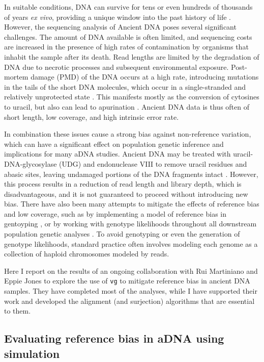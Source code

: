 \documentclass[a4paper,12pt,numbered,oneside]{Classes/PhDThesisPSnPDF}
\begin{document}
In suitable conditions, DNA can survive for tens or even hundreds of thousands of years \emph{ex vivo}, providing a unique window into the past history of life \cite{dabney2013ancient}.
However, the sequencing analysis of Ancient DNA poses several significant challenges.
The amount of DNA available is often limited, and sequencing costs are increased in the presence of high rates of contamination by organisms that inhabit the sample after its death.
Read lengths are limited by the degradation of DNA due to necrotic processes and subsequent environmental exposure.
Post-mortem damage (PMD) of the DNA occurs at a high rate, introducing mutations in the tails of the short DNA molecules, which occur in a single-stranded and relatively unprotected state \cite{link2017atlas}.
This manifests mostly as the conversion of cytosines to uracil, but also can lead to apurination \cite{dabney2013ancient}.
Ancient DNA data is thus often of short length, low coverage, and high intrinsic error rate.

In combination these issues cause a strong bias against non-reference variation, which can have a significant effect on population genetic inference and implications for many aDNA studies.
Ancient DNA may be treated with uracil-DNA-glycosylase (UDG) and endonuclease VIII to remove uracil residues and abasic sites, leaving undamaged portions of the DNA fragments intact \cite{briggs2009removal}.
However, this process results in a reduction of read length and library depth, which is disadvantageous, and it is not guaranteed to proceed without introducing new bias.
There have also been many attempts to mitigate the effects of reference bias and low coverage, such as by implementing a model of reference bias in gentoyping \cite{pruefer2018snpad}, or by working with genotype likelihoods throughout all downstream population genetic analyses \cite{link2017atlas}.
To avoid genotyping or even the generation of genotype likelihoods, standard practice often involves modeling each genome as a collection of haploid chromosomes modeled by reads.

Here I report on the results of an ongoing collaboration with Rui Martiniano and Eppie Jones to explore the use of {\tt vg} to mitigate reference bias in ancient DNA samples.
They have completed most of the analyses, while I have supported their work and developed the alignment (and surjection) algorithms that are essential to them.

\subsection{Evaluating reference bias in aDNA using simulation}
\end{document}
